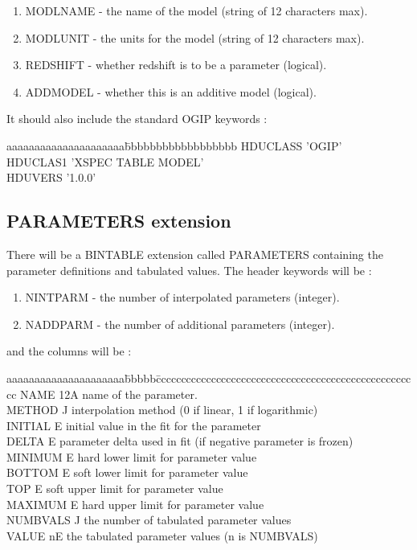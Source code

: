 \documentclass[11pt]{article}
\begin{document}
\begin{enumerate}
\item MODLNAME - the name of the model (string of 12 characters max).
\item MODLUNIT - the units for the model (string of 12 characters max).
\item REDSHIFT - whether redshift is to be a parameter (logical).
\item ADDMODEL - whether this is an additive model (logical).
\end{enumerate}

It should also include the standard OGIP keywords :

\begin{tabbing}
aaaaaaaaaaaaaaaaaaaaa\=bbbbbbbbbbbbbbbbbb\kill
HDUCLASS             \> 'OGIP'           \\
HDUCLAS1             \> 'XSPEC TABLE MODEL'    \\
HDUVERS              \> '1.0.0'          \\
\end{tabbing}

\subsection{PARAMETERS extension}

There will be a BINTABLE extension called PARAMETERS containing the 
parameter definitions and tabulated values. The header keywords will be :

\begin{enumerate}
\item NINTPARM - the number of interpolated parameters (integer).
\item NADDPARM - the number of additional parameters (integer).
\end{enumerate}

and the columns will be :

\begin{tabbing}
aaaaaaaaaaaaaaaaaaaaa\=bbbbb\=ccccccccccccccccccccccccccccccccccccccccccccccccccccc\kill
NAME      \> 12A \> name of the parameter.\\
METHOD    \> J   \> interpolation method (0 if linear, 1 if logarithmic)\\
INITIAL   \> E   \> initial value in the fit for the parameter\\
DELTA     \> E   \> parameter delta used in fit (if negative parameter is frozen)\\
MINIMUM   \> E   \> hard lower limit for parameter value\\
BOTTOM    \> E   \> soft lower limit for parameter value\\
TOP       \> E   \> soft upper limit for parameter value\\
MAXIMUM   \> E   \> hard upper limit for parameter value\\
NUMBVALS  \> J   \> the number of tabulated parameter values\\
VALUE     \> nE  \> the tabulated parameter values (n is NUMBVALS)\\
\end{tabbing}
\end{document}

